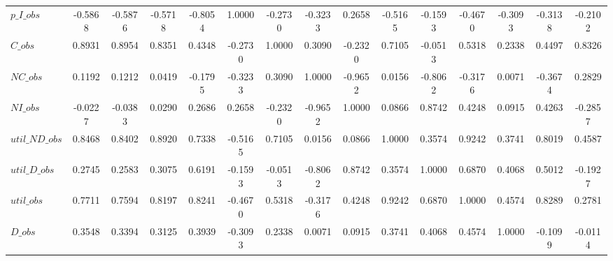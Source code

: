 \begin{center}
\begin{longtable}{lcccccccccccccc}
$p\_I\_obs      $	 & 	          -0.5868	 & 	          -0.5876	 & 	          -0.5718	 & 	          -0.8054	 & 	           1.0000	 & 	          -0.2730	 & 	          -0.3233	 & 	           0.2658	 & 	          -0.5165	 & 	          -0.1593	 & 	          -0.4670	 & 	          -0.3093	 & 	          -0.3138	 & 	          -0.2102 \\ 
$C\_obs         $	 & 	           0.8931	 & 	           0.8954	 & 	           0.8351	 & 	           0.4348	 & 	          -0.2730	 & 	           1.0000	 & 	           0.3090	 & 	          -0.2320	 & 	           0.7105	 & 	          -0.0513	 & 	           0.5318	 & 	           0.2338	 & 	           0.4497	 & 	           0.8326 \\ 
$NC\_obs        $	 & 	           0.1192	 & 	           0.1212	 & 	           0.0419	 & 	          -0.1795	 & 	          -0.3233	 & 	           0.3090	 & 	           1.0000	 & 	          -0.9652	 & 	           0.0156	 & 	          -0.8062	 & 	          -0.3176	 & 	           0.0071	 & 	          -0.3674	 & 	           0.2829 \\ 
$NI\_obs        $	 & 	          -0.0227	 & 	          -0.0383	 & 	           0.0290	 & 	           0.2686	 & 	           0.2658	 & 	          -0.2320	 & 	          -0.9652	 & 	           1.0000	 & 	           0.0866	 & 	           0.8742	 & 	           0.4248	 & 	           0.0915	 & 	           0.4263	 & 	          -0.2857 \\ 
$util\_ND\_obs  $	 & 	           0.8468	 & 	           0.8402	 & 	           0.8920	 & 	           0.7338	 & 	          -0.5165	 & 	           0.7105	 & 	           0.0156	 & 	           0.0866	 & 	           1.0000	 & 	           0.3574	 & 	           0.9242	 & 	           0.3741	 & 	           0.8019	 & 	           0.4587 \\ 
$util\_D\_obs   $	 & 	           0.2745	 & 	           0.2583	 & 	           0.3075	 & 	           0.6191	 & 	          -0.1593	 & 	          -0.0513	 & 	          -0.8062	 & 	           0.8742	 & 	           0.3574	 & 	           1.0000	 & 	           0.6870	 & 	           0.4068	 & 	           0.5012	 & 	          -0.1927 \\ 
$util\_obs      $	 & 	           0.7711	 & 	           0.7594	 & 	           0.8197	 & 	           0.8241	 & 	          -0.4670	 & 	           0.5318	 & 	          -0.3176	 & 	           0.4248	 & 	           0.9242	 & 	           0.6870	 & 	           1.0000	 & 	           0.4574	 & 	           0.8289	 & 	           0.2781 \\ 
$D\_obs         $	 & 	           0.3548	 & 	           0.3394	 & 	           0.3125	 & 	           0.3939	 & 	          -0.3093	 & 	           0.2338	 & 	           0.0071	 & 	           0.0915	 & 	           0.3741	 & 	           0.4068	 & 	           0.4574	 & 	           1.0000	 & 	          -0.1099	 & 	          -0.0114 \\ 

\end{longtable}
\end{center}
